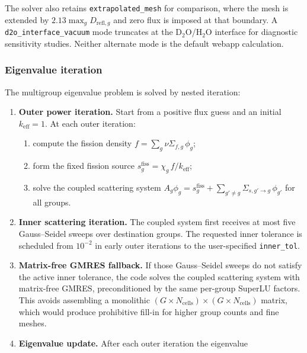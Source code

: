 \documentclass[11pt]{article}
\begin{document}
The solver also retains \texttt{extrapolated\_mesh} for comparison, where the
mesh is extended by $2.13\max_gD_{\mathrm{refl},g}$ and zero flux is imposed at
that boundary.  A \texttt{d2o\_interface\_vacuum} mode truncates at the
D$_2$O/H$_2$O interface for diagnostic sensitivity studies.  Neither alternate
mode is the default webapp calculation.

\subsubsection{Eigenvalue iteration}

The multigroup eigenvalue problem is solved by nested iteration:

\begin{enumerate}
  \item \textbf{Outer power iteration.}  Start from a positive flux guess
        and an initial $k_{\mathrm{eff}} = 1$.  At each outer iteration:
        \begin{enumerate}
          \item compute the fission density $f = \sum_g \nu\Sigma_{f,g}\,\phi_g$;
          \item form the fixed fission source $s^{\mathrm{fiss}}_g
                = \chi_g\,f / k_{\mathrm{eff}}$;
          \item solve the coupled scattering system
                $A_g \phi_g = s^{\mathrm{fiss}}_g
                + \sum_{g'\neq g} \Sigma_{s,g'\to g}\,\phi_{g'}$
                for all groups.
        \end{enumerate}
  \item \textbf{Inner scattering iteration.}  The coupled system first receives
        at most five Gauss--Seidel sweeps over destination groups.  The
        requested inner tolerance is scheduled from $10^{-2}$ in early outer
        iterations to the user-specified \texttt{inner\_tol}.
  \item \textbf{Matrix-free GMRES fallback.}  If those Gauss--Seidel sweeps do
        not satisfy the active inner tolerance, the code solves the coupled
        scattering system with matrix-free GMRES, preconditioned by the same
        per-group SuperLU factors.  This avoids assembling a monolithic
        $(G \times N_{\mathrm{cells}}) \times (G \times N_{\mathrm{cells}})$
        matrix, which would produce prohibitive fill-in for higher group
        counts and fine meshes.
  \item \textbf{Eigenvalue update.}  After each outer iteration the eigenvalue

\end{enumerate}
\end{document}
